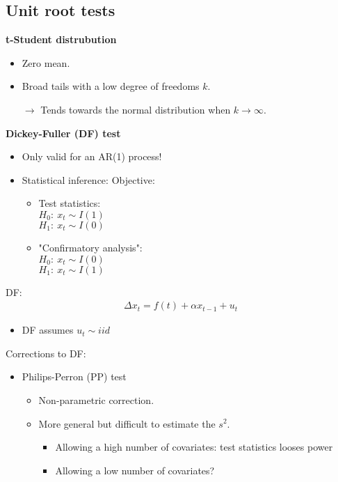 \begin{multicols}{2}
 \subsection{Unit root tests}
 \textbf{t-Student distrubution}
 \begin{itemize}
  \item Zero mean.
  \item Broad tails with a low degree of freedoms $k$.
  \item[$\rightarrow$] Tends towards the normal distribution when $k\rightarrow\infty$.
 \end{itemize}
 \textbf{Dickey-Fuller (DF) test}
 \begin{itemize}
  \item Only valid for an AR(1) process!
  \item Statistical inference: Objective:
        \begin{itemize}
         \item Test statistics:\\
               $H_0:\ x_t \sim I(1)$\\
               $H_1:\ x_t \sim I(0)$
         \item "Confirmatory analysis":\\
               $H_0:\ x_t \sim I(0)$\\
               $H_1:\ x_t \sim I(1)$
        \end{itemize}
 \end{itemize}
 DF:
 \begin{align*}
  \Delta x_t=f(t)+\alpha x_{t-1}+u_t
 \end{align*}
 \begin{itemize}
  \item DF assumes $u_t\sim iid$
 \end{itemize}
 Corrections to DF:
 \begin{itemize}
  \item Philips-Perron (PP) test
        \begin{itemize}
         \item Non-parametric correction.
         \item More general but difficult to estimate the $s^2$.
               \begin{itemize}
                \item Allowing a high number of covariates: test statistics looses power
                \item Allowing a low number of covariates?
               \end{itemize}

\end{itemize}
\end{itemize}
\end{multicols}

